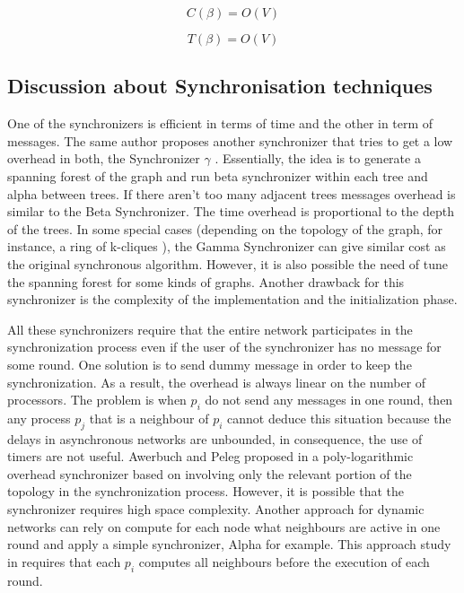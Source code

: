 \begin{equation}
\label{ec:message-beta}
 C(\beta) = O(V)
 \end{equation}

\begin{equation}
\label{ec:time-beta}
 T(\beta) = O(V) 
\end{equation}

\subsection{Discussion about Synchronisation techniques}

One of the synchronizers is efficient in terms of time and the other in term of messages. The same author proposes \cite{awerbuch1985complexity} another synchronizer that tries to get a low overhead in both, the Synchronizer $\gamma$ . Essentially, the idea is to generate a spanning forest of the graph and run beta synchronizer within each tree and alpha between trees. If there aren't too many adjacent trees messages overhead is similar to the Beta Synchronizer. The time overhead is proportional to the depth of the trees. In some special cases  (depending on the topology of the graph, for instance, a ring of k-cliques \cite{lynch1996distributed}), the Gamma Synchronizer can give similar cost as the original synchronous algorithm. However, it is also possible the need of tune the spanning forest for some kinds of graphs. Another drawback for this synchronizer is the complexity of the implementation and the initialization phase.

All these synchronizers require that the entire network participates in the synchronization process even if the user of the synchronizer has no message for some round. One solution is  to send dummy message in order to keep the synchronization. As a result, the overhead is always linear on the number of processors. The problem is when $p_i$ do not send any messages in one round, then any process $p_j$ that is a neighbour of $p_i$ cannot deduce this situation because the delays in asynchronous networks are unbounded, in consequence, the use of timers are not useful. Awerbuch and Peleg proposed in \cite{awerbuch1990network} a poly-logarithmic overhead synchronizer based on involving only the relevant portion of the topology in the synchronization process. However, it is possible that the synchronizer requires high space complexity.  Another approach for dynamic networks can rely on compute for each node what neighbours are active in one round and apply a simple synchronizer, Alpha for example. This approach study in \cite{AspnesW2007} requires that each $p_i$ computes all neighbours before the execution of each round.

